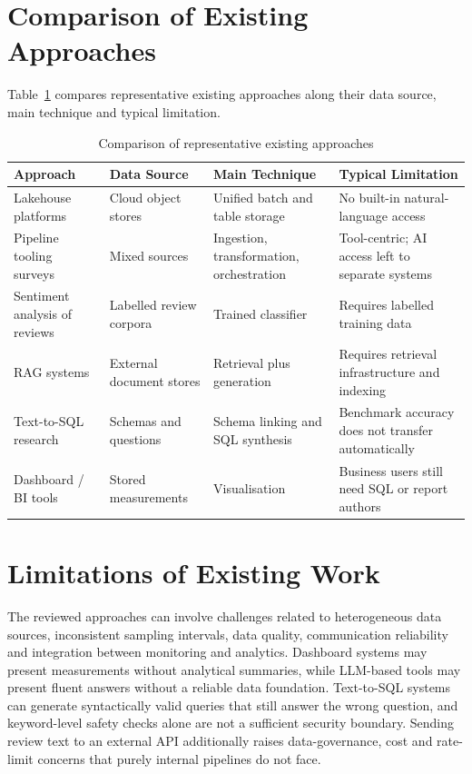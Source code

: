 \documentclass[12pt,a4paper]{report}
\begin{document}
\section{Comparison of Existing Approaches}
Table~\ref{tab:lit} compares representative existing approaches along their data source, main technique and typical limitation.

\begin{table}[htbp]
\centering
\caption{Comparison of representative existing approaches}
\label{tab:lit}
\small
\begin{tabular}{@{}p{3.1cm}p{2.6cm}p{3.4cm}p{4.2cm}@{}}
\toprule
\textbf{Approach} & \textbf{Data Source} & \textbf{Main Technique} & \textbf{Typical Limitation} \\
\midrule
Lakehouse platforms~\cite{ref1,ref7,ref8} & Cloud object stores & Unified batch and table storage & No built-in natural-language access \\
Pipeline tooling surveys~\cite{ref2,ref9} & Mixed sources & Ingestion, transformation, orchestration & Tool-centric; AI access left to separate systems \\
Sentiment analysis of reviews~\cite{ref11,ref12} & Labelled review corpora & Trained classifier & Requires labelled training data \\
RAG systems~\cite{ref5,ref10} & External document stores & Retrieval plus generation & Requires retrieval infrastructure and indexing \\
Text-to-SQL research~\cite{ref6,ref14,ref15} & Schemas and questions & Schema linking and SQL synthesis & Benchmark accuracy does not transfer automatically \\
Dashboard / BI tools & Stored measurements & Visualisation & Business users still need SQL or report authors \\
\bottomrule
\end{tabular}
\end{table}

\section{Limitations of Existing Work}
The reviewed approaches can involve challenges related to heterogeneous data sources, inconsistent sampling intervals, data quality, communication reliability and integration between monitoring and analytics. Dashboard systems may present measurements without analytical summaries, while LLM-based tools may present fluent answers without a reliable data foundation. Text-to-SQL systems can generate syntactically valid queries that still answer the wrong question, and keyword-level safety checks alone are not a sufficient security boundary. Sending review text to an external API additionally raises data-governance, cost and rate-limit concerns that purely internal pipelines do not face.
\end{document}

